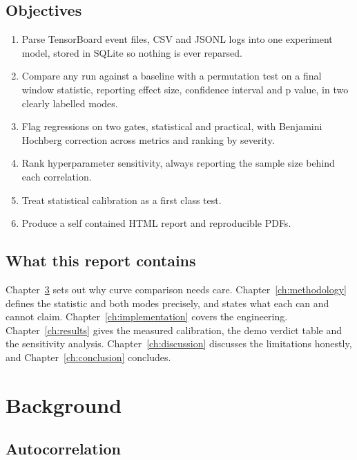 \documentclass[11pt,a4paper]{report}
\begin{document}
\section{Objectives}

\begin{enumerate}
  \item Parse TensorBoard event files, CSV and JSONL logs into one experiment
    model, stored in SQLite so nothing is ever reparsed.
  \item Compare any run against a baseline with a permutation test on a final
    window statistic, reporting effect size, confidence interval and p value, in
    two clearly labelled modes.
  \item Flag regressions on two gates, statistical and practical, with
    Benjamini Hochberg correction across metrics and ranking by severity.
  \item Rank hyperparameter sensitivity, always reporting the sample size behind
    each correlation.
  \item Treat statistical calibration as a first class test.
  \item Produce a self contained HTML report and reproducible PDFs.
\end{enumerate}

\section{What this report contains}

Chapter~\ref{ch:background} sets out why curve comparison needs care.
Chapter~\ref{ch:methodology} defines the statistic and both modes precisely, and
states what each can and cannot claim. Chapter~\ref{ch:implementation} covers the
engineering. Chapter~\ref{ch:results} gives the measured calibration, the demo
verdict table and the sensitivity analysis. Chapter~\ref{ch:discussion} discusses
the limitations honestly, and Chapter~\ref{ch:conclusion} concludes.

\chapter{Background}
\label{ch:background}

\section{Autocorrelation}
\end{document}
